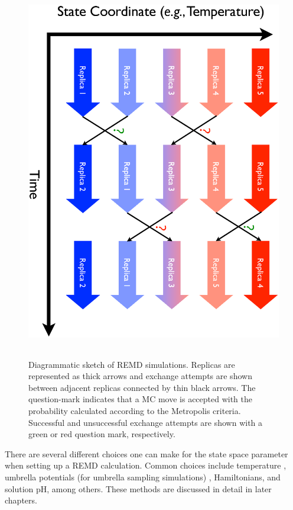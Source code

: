 \begin{figure}
   \includegraphics[height=6.5in, angle=90]
                   {REMD.ps}
   \caption{Diagrammatic sketch of REMD simulations. Replicas are represented as
            thick arrows and exchange attempts are shown between adjacent
            replicas connected by thin black arrows. The question-mark indicates
            that a MC move is accepted with the probability calculated according
            to the Metropolis criteria. Successful and unsuccessful exchange
            attempts are shown with a green or red question mark, respectively.}
   \label{fig2:REMD}
\end{figure}

There are several different choices one can make for the state space parameter
when setting up a REMD calculation. Common choices include temperature
\cite{Sugita_ChemPhysLett_1999_v314_p141}, umbrella potentials (for umbrella
sampling simulations) \cite{Babin_JChemPhys_2008_v128_p134101,
Sugita_JChemPhys_2000_v113_p6042}, Hamiltonians,
\cite{Fukunishi_JChemPhys_2002_v116_p9058, Fajer_JComputChem_2009_v30_p1719,
Arrar_JChemTheoryComput_2013_v9_p18, Jiang_JChemTheoryComput_2010_v6_p2559,
Meng_JChemTheoryComput_2011_v7_p2721} and solution pH,
\cite{Wallace_JChemTheoryComput_2011_v7_p2617, Itoh_Proteins_2011_v79_p3420,
Swails_JChemTheoryComput_2012_v8_p4393, Dashti_JPhysChemB_2012_v116_p8805}
among others. \cite{Wu_JChemPhys_2012_v137_p044106,
Bolhuis_JChemPhys_2008_v129_p114108} These methods are discussed in detail in
later chapters.

